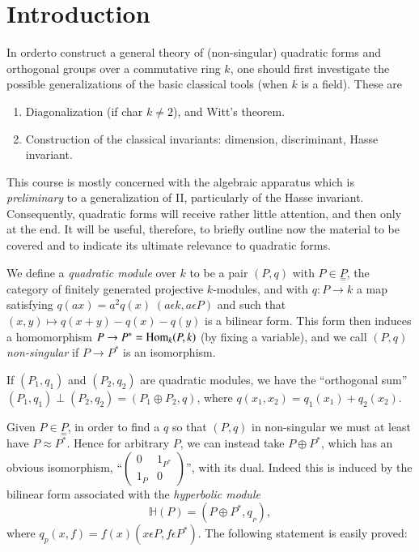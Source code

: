 
\chapter*{Introduction}

In order\pageoriginale to construct a general theory of (non-singular)
quadratic forms and orthogonal groups over a  commutative ring $k$,
one should first investigate the possible generalizations of the basic
classical tools (when $k$ is a field). These are    
\begin{enumerate}
\renewcommand{\theenumi}{\Roman{enumi}}
\renewcommand{\labelenumi}{(\theenumi)}
\item Diagonalization (if char $k \neq 2$), and Witt's theorem. 

\item Construction of the classical invariants: dimension,
  discriminant, Hasse invariant. 
\end{enumerate}

This course is mostly concerned with the algebraic apparatus which is
\textit{preliminary} to a generalization of II, particularly of the
Hasse invariant. Consequently, quadratic forms will receive rather
little attention, and then only at the end. It will be useful,
therefore, to briefly outline now the material to be covered and to
indicate its ultimate relevance to quadratic forms. 

We define a \textit{quadratic module} over $k$ to be a pair $(P, q)$
with $P \in \underset{=}P$, the category of finitely generated
projective $k$-modules, and with $q: P \to k$ a map satisfying
$q(ax) = a^2 q (x) \;  (a \epsilon k, a \epsilon P)$ and such that $(x, y)
\longmapsto q(x + y) - q(x) -q(y)$ is a bilinear form. This
form then induces a homomorphism $P \to P^* = \operatorname{Hom}_k (P, k)$ (by
fixing a variable), and we call $(P, q)$ \textit{non-singular} if $P
\to P^*$ is an isomorphism. 

If $(P_1, q_1)$ and $(P_2, q_2)$ are quadratic modules, we have the 
``orthogonal sum'' $(P_1, q_1) \perp (P_2, q_2) = (P_1 \oplus P_2,
q)$, where $q (x_1, x_2) = q_1(x_1) + q_2(x_2)$. 

Given \pageoriginale $P \in \underset{=}P$, in order to find a $q$ so
that $(P, q)$ 
in non-singular we must at least have $P \approx P^*$. Hence for
arbitrary $P$, we can instead take $P \oplus P^*$, which has an
obvious isomorphism, ``$\left(\begin{smallmatrix} 0 & 1_{P^*}
  \\ 1_P & 0 \end{smallmatrix}\right)$'', with its dual. Indeed this
is induced by the bilinear form associated with the \textit{hyperbolic
  module} 
$$
\mathbb{H} (P) = (P \oplus P^*, q_{_P}), 
$$
where $q_p(x, f) = f(x) (x \epsilon P, f \epsilon P^*)$. The following
statement is easily proved: 


